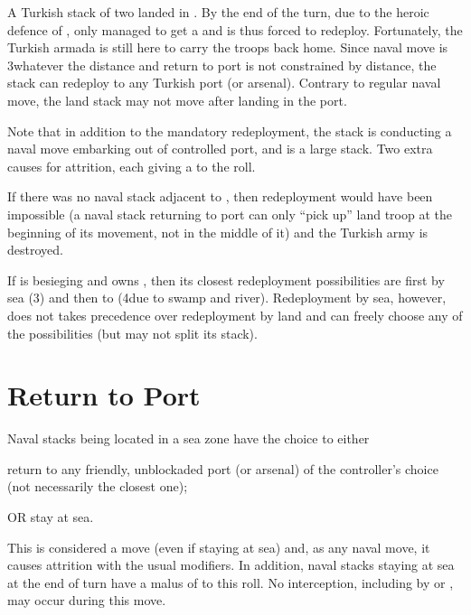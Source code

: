 \begin{exemple}
  A Turkish stack of two \Janissaire \ARMY\Faceplus landed in
  \provinceMalta. By the end of the turn, due to the heroic defence of
  , \TUR only managed to get a \USURE\Facemoins and is thus
  forced to redeploy. Fortunately, the Turkish armada is still here to carry
  the troops back home. Since naval move is 3\MP whatever the distance and
  return to port is not constrained by distance, the stack can redeploy to any
  Turkish port (or arsenal). Contrary to regular naval move, the land stack
  may not move after landing in the port.

  Note that in addition to the mandatory redeployment, the stack is conducting
  a naval move embarking out of controlled port, and is a large stack. Two
  extra causes for attrition, each giving a  to the roll.

  If there was no naval stack adjacent to \provinceMalta, then redeployment
  would have been impossible (a naval stack returning to port can only ``pick
  up'' land troop at the beginning of its movement, not in the middle of it)
  and the Turkish army is destroyed.

  \smallskip

  If \SUE is besieging \provinceDanzig and owns \provinceHinterpommern,
  then its closest redeployment possibilities are first by sea (3\MP)
  and then to \provinceHinterpommern (4\MP due to swamp and
  river). Redeployment by sea, however, does not takes precedence over
  redeployment by land and \SUE can freely choose any of the
  possibilities (but may not split its stack).
\end{exemple}

\section{Return to Port}\label{chRedep:Return port}
\aparag[Navies]
\bparag Naval stacks being located in a sea zone have the choice to either
\begin{modlist}
\item return to any friendly, unblockaded port (or arsenal) of the
  controller's choice (not necessarily the closest one);
\item OR stay at sea.
\end{modlist}
\bparag This is considered a move (even if staying at sea) and, as any naval
move, it causes attrition with the usual modifiers.
\bparag In addition, naval stacks staying at sea at the end of turn have a
malus of  to this roll.
\bparag No interception, including by \Presidios or \StraitFort, may occur
during this move.

